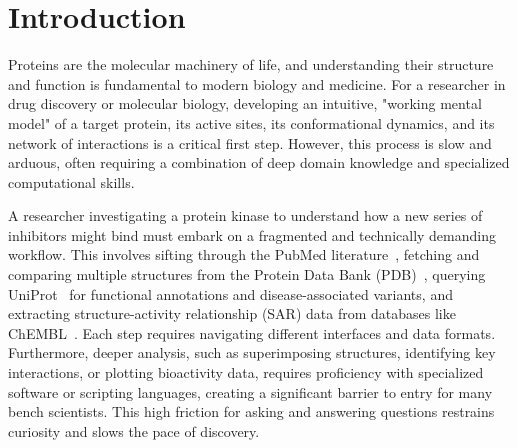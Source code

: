 \documentclass{article}
\begin{document}
\begin{abstract}
Building a working mental model of a protein typically requires weeks of reading, cross-referencing crystal and predicted structures, and inspecting ligand complexes, an effort that is slow, unevenly accessible, and often requires specialized computational skills. We introduce \emph{Speak to a Protein}, a new capability that turns protein analysis into an interactive, multimodal dialogue with an expert co-scientist. The AI system retrieves and synthesizes relevant literature, structures, and ligand data; grounds answers in a live 3D scene; and can highlight, annotate, manipulate and see the visualization. It also generates and runs code when needed, explaining results in both text and graphics.
We demonstrate these capabilities on relevant proteins, posing questions about binding pockets, conformational changes, or structure-activity relationships to test ideas in real-time. \emph{Speak to a Protein} reduces the time from question to evidence, lowers the barrier to advanced structural analysis, and enables hypothesis generation by tightly coupling language, code, and 3D structures. 
Speak to a Protein is freely accessible at \url{(URL to be disclosed after publication)}.

\end{abstract}

\section{Introduction}\label{sec:intro}
Proteins are the molecular machinery of life, and understanding their structure and function is fundamental to modern biology and medicine. For a researcher in drug discovery or molecular biology, developing an intuitive, "working mental model" of a target protein, its active sites, its conformational dynamics, and its network of interactions is a critical first step. However, this process is slow and arduous, often requiring a combination of deep domain knowledge and specialized computational skills.

A researcher investigating a protein kinase to understand how a new series of inhibitors might bind must embark on a fragmented and technically demanding workflow. This involves sifting through the PubMed literature~\citep{Sayers2020}, fetching and comparing multiple structures from the Protein Data Bank (PDB)~\citep{Burley2018}, querying UniProt~\citep{UniProt2022}  for functional annotations and disease-associated variants, and extracting structure-activity relationship (SAR) data from databases like ChEMBL~\citep{Mendez2018}. Each step requires navigating different interfaces and data formats. Furthermore, deeper analysis, such as superimposing structures, identifying key interactions, or plotting bioactivity data, requires proficiency with specialized software or scripting languages, creating a significant barrier to entry for many bench scientists. This high friction for asking and answering questions restrains curiosity and slows the pace of discovery.
\end{document}
